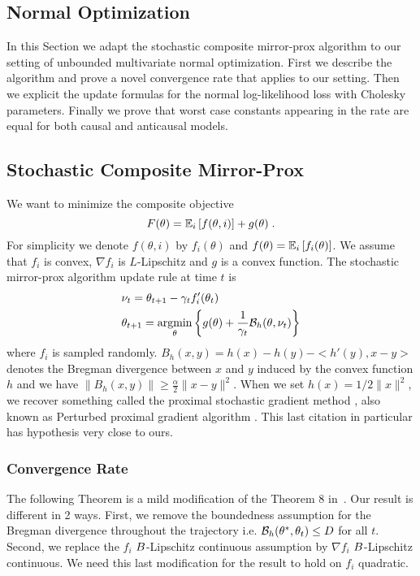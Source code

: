 \begin{subappendices}
\section{{Normal Optimization}}
\label{apdx:normal_optimization}
In this Section we adapt the stochastic composite mirror-prox algorithm to our setting of unbounded multivariate normal optimization. 
First we describe the algorithm and prove a novel convergence rate that applies to our setting. 
Then we explicit the update formulas for the normal log-likelihood loss with Cholesky parameters. 
Finally we prove that worst case constants appearing in the rate are equal for both causal and anticausal models.

\subsection{Stochastic Composite Mirror-Prox}
\label{apdx:normal_conv_rate}

We want to minimize the composite objective 
\[
F(\theta) = \expect[i]{ f(\theta,i)} + g(\theta)\; .
\]
For simplicity we denote $f(\theta,i)$ by $f_i(\theta)$ and $f(\theta) = \expect[i]{f_i(\theta)}$. 
We assume that $f_i$ is convex, 
$\nabla f_i$ is  $L$-Lipschitz
and $g$ is a convex function. 
The stochastic mirror-prox algorithm update rule at time $t$ is 
\begin{align}
    &\nu_{t} = \theta_{t+1} - \gamma_t f'_i (\theta_t)\\
    & \theta_{t+1} = \argmin_{\theta}\left\{g(\theta)+\frac{1}{\gamma_t}\cB_{h}(\theta,\nu_t)\right\}
\end{align}
where $f_i$ is sampled randomly. $B_h(x,y)=h(x)-h(y)-<h'(y),x-y>$ denotes the Bregman divergence between $x$ and $y$ induced by the convex function $h$ and we have $\|B_h(x,y)\| \geq \frac{\alpha}{2} \|x-y\|^2$. When we set $h(x)= 1/2\|x\|^2$, we recover something called the proximal stochastic gradient method \citep{duchi2009efficient}, also known as Perturbed proximal gradient algorithm \citep{atchade2017perturbed}. 
This last citation in particular has hypothesis very close to ours. 

\subsubsection{Convergence Rate}
The following Theorem is a mild modification of the Theorem 8 in~\citep{duchi2010composite}.
Our result is different in 2 ways. 
First, we remove the boundedness assumption for the Bregman divergence throughout the trajectory i.e. $\cB_{h}(\theta^*,\theta_t) \leq D$ for all $t$.
Second, we replace the $f_i$ $\smoothness$-Lipschitz continuous assumption by $\nabla f_i$ $\smoothness$-Lipschitz continuous. 
We need this last modification for the result to hold on $f_i$ quadratic.


\end{subappendices}
